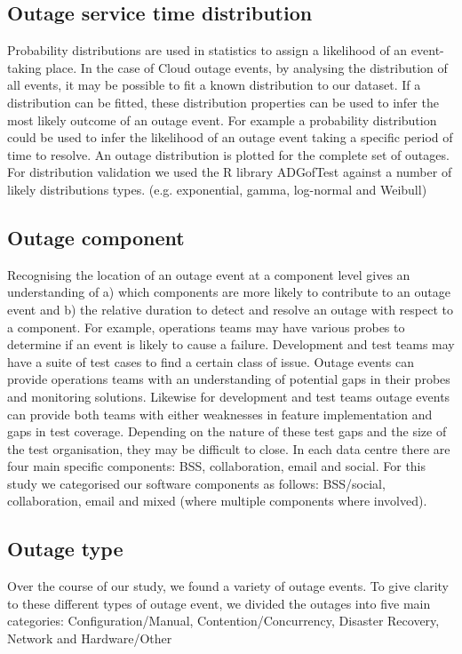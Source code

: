 \subsection{Outage service time distribution}

Probability distributions are used in statistics to assign a likelihood of an event-taking place. In the case of Cloud outage events, by analysing the distribution of all events, it may be possible to fit a known distribution to our dataset. If a distribution can be fitted, these distribution properties can be used to infer the most likely outcome of an outage event. For example a probability distribution could be used to infer the likelihood of an outage event taking a specific period of time to resolve. An outage distribution is plotted for the complete set of outages. For distribution validation we used the R library ADGofTest \cite{ADGoF} against a number of likely distributions types. (e.g. exponential, gamma, log-normal and Weibull)

\subsection{Outage component}

Recognising the location of an outage event at a component level gives an understanding of a) which components are more likely to contribute to an outage event and b) the relative duration to detect and resolve an outage with respect to a component. For example, operations teams may have various probes to determine if an event is likely to cause a failure. Development and test teams may have a suite of test cases to find a certain class of issue. Outage events can provide operations teams with an understanding of potential gaps in their probes and monitoring solutions. Likewise for development and test teams outage events can provide both teams with either weaknesses in feature implementation and gaps in test coverage. Depending on the nature of these test gaps and the size of the test organisation, they may be difficult to close. In each data centre there are four main specific components: BSS, collaboration, email and social. For this study we categorised our software components as follows: BSS/social, collaboration, email and mixed (where multiple components where involved). \par

\subsection{Outage type}
Over the course of our study, we found a variety of outage events. To give clarity to these different types of outage event, we divided the outages into five main categories: Configuration/Manual, Contention/Concurrency, Disaster Recovery, Network and Hardware/Other \par

